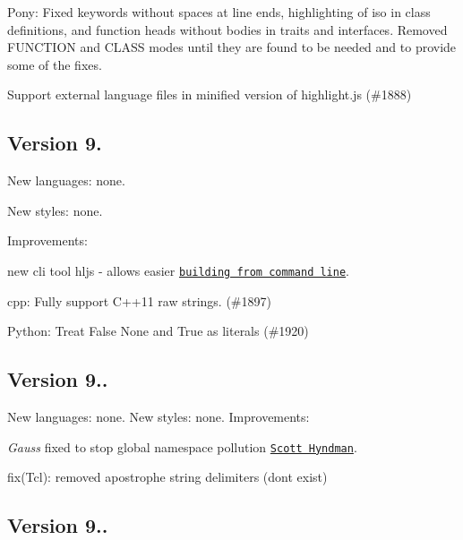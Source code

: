 \begin{DoxyItemize}
\item Pony\+: Fixed keywords without spaces at line ends, highlighting of {\ttfamily iso} in class definitions, and function heads without bodies in traits and interfaces. Removed F\+U\+N\+C\+T\+I\+ON and C\+L\+A\+SS modes until they are found to be needed and to provide some of the fixes.
\begin{DoxyItemize}
\item Support external language files in minified version of highlight.\+js (\#1888)
\end{DoxyItemize}
\end{DoxyItemize}

\subsection*{Version 9.}

New languages\+: none.

New styles\+: none.

Improvements\+:
\begin{DoxyItemize}
\item new cli tool {\ttfamily hljs} -\/ allows easier \href{docs/building-testing.rst#building-a-bundle-from-the-command-line}{\tt building from command line}.
\item cpp\+: Fully support C++11 raw strings. (\#1897)
\item Python\+: Treat False None and True as literals (\#1920)
\end{DoxyItemize}

\subsection*{Version 9..}

New languages\+: none. New styles\+: none. Improvements\+:
\begin{DoxyItemize}
\item {\itshape Gauss} fixed to stop global namespace pollution \href{https://github.com/shyndman}{\tt Scott Hyndman}.
\item fix(\+Tcl)\+: removed apostrophe string delimiters (don\textquotesingle{}t exist)
\end{DoxyItemize}

\subsection*{Version 9..}


